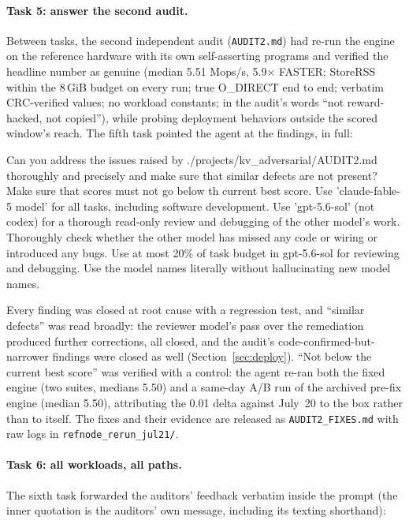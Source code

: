 \documentclass{article}
\newenvironment{promptbox}{\begin{mdframed}[linewidth=0.4pt,linecolor=black,innerleftmargin=5pt,innerrightmargin=5pt,innertopmargin=5pt,innerbottommargin=5pt,skipabove=2pt,skipbelow=5pt]\setlength{\parskip}{0pt}\setlength{\parindent}{0pt}\ttfamily\scriptsize\raggedright\frenchspacing\obeylines\leavevmode\strut\ignorespaces}{\end{mdframed}}
\newcommand{\SpeedupFinal}{5.9$\times$}
\newcommand{\HydraAuditVerified}{5.51}  %
\newcommand{\HydraAuditFixed}{5.50}     %
\newcommand{\MemBudget}{8\,GiB}
\begin{document}
\paragraph{Task 5: answer the second audit.}
Between tasks, the second independent audit (\texttt{AUDIT2.md}) had re-run the engine on the reference hardware with its own self-asserting programs and verified the headline number as genuine (median \HydraAuditVerified{} Mops/s, \SpeedupFinal{} FASTER; StoreRSS within the \MemBudget{} budget on every run; true O\_DIRECT end to end; verbatim CRC-verified values; no workload constants; in the audit's words ``not reward-hacked, not copied''), while probing deployment behaviors outside the scored window's reach. The fifth task pointed the agent at the findings, in full:

\begin{promptbox}
Can you address the issues raised by ./projects/kv\_adversarial/AUDIT2.md thoroughly and precisely and make sure that similar defects are not present?  Make sure that scores must not go below th current best score.  Use 'claude-fable-5 model' for all tasks, including software development. Use 'gpt-5.6-sol' (not codex) for a thorough read-only review and debugging of the other model's work. Thoroughly check whether the other model has missed any code or wiring or introduced any bugs. Use at most 20\% of task budget in gpt-5.6-sol for reviewing and debugging. Use the model names literally without hallucinating new model names.
\end{promptbox}

Every finding was closed at root cause with a regression test, and ``similar defects'' was read broadly: the reviewer model's pass over the remediation produced further corrections, all closed, and the audit's code-confirmed-but-narrower findings were closed as well (Section~\ref{sec:deploy}). ``Not below the current best score'' was verified with a control: the agent re-ran both the fixed engine (two suites, medians \HydraAuditFixed) and a same-day A/B run of the archived pre-fix engine (median \HydraAuditFixed), attributing the 0.01 delta against July~20 to the box rather than to itself. The fixes and their evidence are released as \texttt{AUDIT2\_FIXES.md} with raw logs in \texttt{refnode\_rerun\_jul21/}.

\paragraph{Task 6: all workloads, all paths.}
The sixth task forwarded the auditors' feedback verbatim inside the prompt (the inner quotation is the auditors' own message, including its texting shorthand):
\end{document}
